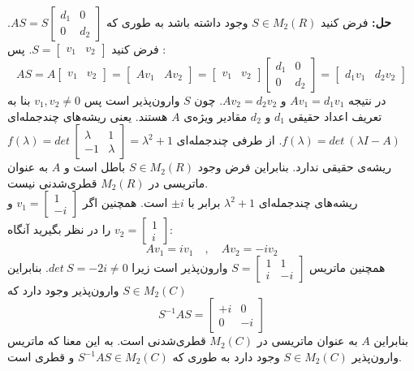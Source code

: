 \textbf{حل:}
 فرض کنید $S\in M_2(R)$ وجود داشته باشد به طوری که 
$AS = S\begin{bmatrix}
d_1 &0\\
0& d_2
\end{bmatrix}$. فرض کنید $S = \begin{bmatrix}
v_1 & v_2
\end{bmatrix}$. 
پس :
$$AS = A\begin{bmatrix}
v_1 & v_2
\end{bmatrix} = \begin{bmatrix}
Av_1 & Av_2
\end{bmatrix} = \begin{bmatrix}
v_1 & v_2
\end{bmatrix}\begin{bmatrix}
d_1 & 0\\
0 & d_2
\end{bmatrix} = \begin{bmatrix}
d_1v_1 & d_2v_2
\end{bmatrix}$$
در نتیجه 
$Av_1 = d_1v_1$
و 
$Av_2 = d_2v_2$.
چون $S$ وارون‌پذیر است پس 
$v_1 , v_2 \neq 0$
بنا به تعریف اعداد حقیقی $d_1$ و $d_2$ مقادیر ویژه‌ی $A$ هستند. یعنی ریشه‌های چند‌جمله‌ای 
$f(\lambda) = det\: (\lambda I -A)$.
 از طرفی چند‌جمله‌ای 
$f(\lambda) = det\: \begin{bmatrix}
\lambda & 1\\
-1 & \lambda
\end{bmatrix} = \lambda^2 +1 $
 ریشه‌ی حقیقی ندارد. بنابراین فرض وجود $S \in M_2(R)$ باطل است و $A$ به عنوان ماتریسی در $M_2(R)$ قطری‌شدنی نیست. \\
ریشه‌های چند‌جمله‌ای $\lambda^2+1$ برابر با $\pm i$ است. همچنین اگر 
$v_1 = \begin{bmatrix}
1\\ -i
\end{bmatrix}$
 و 
$v_2 = \begin{bmatrix}
1\\i
\end{bmatrix}$
را در نظر بگیرید آنگاه:
$$Av_1 = iv_1 \quad , \quad Av_2 = -iv_2$$
همچنین ماتریس $S = \begin{bmatrix}
1&1\\
i& -i
\end{bmatrix}$ وارون‌پذیر است زیرا $det\: S = -2i \neq 0$. بنابراین $S \in M_2(C)$ وارون‌پذیر وجود دارد که $$S^{-1}AS = \begin{bmatrix}
+i & 0\\
0 & -i
\end{bmatrix}$$ 
بنابراین $A$ به عنوان ماتریسی در $M_2(C)$ قطری‌شدنی است. به این معنا که ماتریس وارون‌پذیر $S \in M_2(C)$ وجود دارد به طوری که $S^{-1}AS \in M_2(C)$ و قطری است.\\
